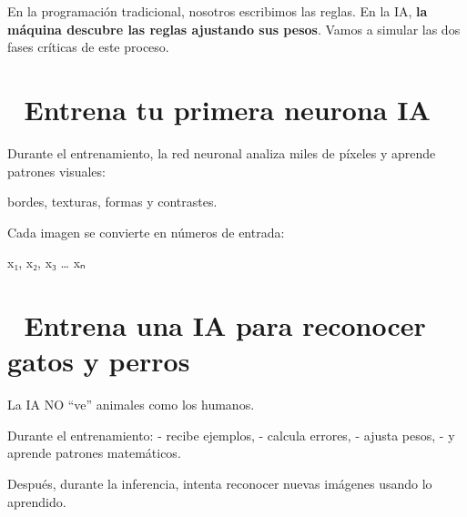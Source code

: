 \documentclass[
  spanish,
  letterpaper,
  DIV=11,
  numbers=noendperiod,
  oneside]{scrreprt}
\begin{document}
En la programación tradicional, nosotros escribimos las reglas. En la
IA, \textbf{la máquina descubre las reglas ajustando sus pesos}. Vamos a
simular las dos fases críticas de este proceso.

\section{🧠 Entrena tu primera neurona
IA}\label{entrena-tu-primera-neurona-ia}

\protect{}\label{ai-neural-lab}

Durante el entrenamiento, la red neuronal analiza miles de píxeles y
aprende patrones visuales:

bordes, texturas, formas y contrastes.

Cada imagen se convierte en números de entrada:

x₁, x₂, x₃ \ldots{} xₙ

\protect{}\label{neural-lab-v3}

\section{🧠 Entrena una IA para reconocer gatos y
perros}\label{entrena-una-ia-para-reconocer-gatos-y-perros}

\begin{tcolorbox}[enhanced jigsaw, arc=.35mm, bottomrule=.15mm, bottomtitle=1mm, breakable, colback=white, colbacktitle=quarto-callout-important-color!10!white, colframe=quarto-callout-important-color-frame, coltitle=black, left=2mm, leftrule=.75mm, opacityback=0, opacitybacktitle=0.6, rightrule=.15mm, title=\textcolor{quarto-callout-important-color}{\faExclamation}\hspace{0.5em}{¿Qué está ocurriendo aquí?}, titlerule=0mm, toprule=.15mm, toptitle=1mm]

La IA NO ``ve'' animales como los humanos.

Durante el entrenamiento: - recibe ejemplos, - calcula errores, - ajusta
pesos, - y aprende patrones matemáticos.

Después, durante la inferencia, intenta reconocer nuevas imágenes usando
lo aprendido.

\end{tcolorbox}

\protect{}\label{ai-lab}

\protect{}\label{neurona-demo}
\end{document}
